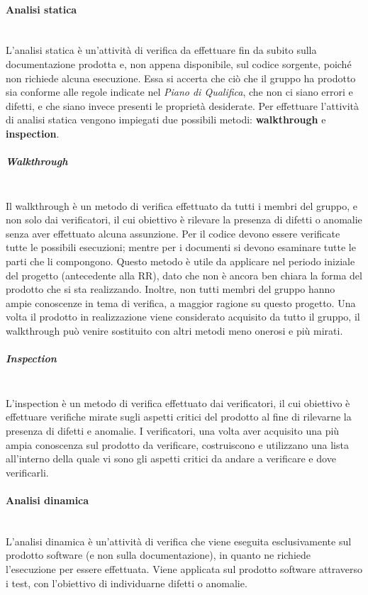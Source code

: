 \paragraph{Analisi statica} \mbox{}\\
L'analisi statica è un'attività di verifica da effettuare fin da subito sulla documentazione prodotta e, non appena disponibile, sul codice sorgente, poiché non richiede alcuna esecuzione.
Essa si accerta che ciò che il gruppo ha prodotto sia conforme alle regole indicate nel \textit{Piano di Qualifica}, che non ci siano errori e difetti, e che siano invece presenti le proprietà desiderate.
Per effettuare l’attività di analisi statica vengono impiegati due possibili metodi: \textbf{walkthrough} e \textbf{inspection}.
\setlength{\parindent}{-0.1em}
\subparagraph*{Walkthrough} \mbox{}\\ %
Il walkthrough è un metodo di verifica effettuato da tutti i membri del gruppo, e non solo dai verificatori, il cui obiettivo è rilevare la presenza di difetti o anomalie senza aver effettuato alcuna assunzione.
Per il codice devono essere verificate tutte le possibili esecuzioni; mentre per i documenti si devono esaminare tutte le parti che li compongono.
Questo metodo è utile da applicare nel periodo iniziale del progetto (antecedente alla RR), dato che non è ancora ben chiara la forma del prodotto che si sta realizzando.
Inoltre, non tutti membri del gruppo hanno ampie conoscenze in tema di verifica, a maggior ragione su questo progetto. Una volta il prodotto in realizzazione viene considerato acquisito da tutto il gruppo, il walkthrough può venire sostituito con altri metodi meno onerosi e più mirati.
\subparagraph*{Inspection} \mbox{}\\
L'inspection è un metodo di verifica effettuato dai verificatori, il cui obiettivo è effettuare verifiche mirate sugli aspetti critici del prodotto al fine di rilevarne la presenza di difetti e anomalie.
I verificatori, una volta aver acquisito una più ampia conoscenza sul prodotto da verificare, costruiscono e utilizzano una lista all’interno della quale vi sono gli aspetti critici da andare a verificare e dove verificarli.

\paragraph{Analisi dinamica} \mbox{}\\
L'analisi dinamica è un'attività di verifica che viene eseguita esclusivamente sul prodotto software (e non sulla documentazione), in quanto ne richiede l'esecuzione per essere effettuata.
Viene applicata sul prodotto software attraverso i test, con l’obiettivo di individuarne difetti o anomalie.

